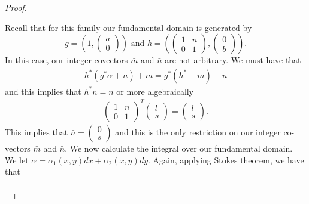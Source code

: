 \begin{proof}
    \begin{case}[$\mathcal{B}_{n,a,b}$]
        Recall that for this family our fundamental domain is generated by
        $$g=\left( 1, \begin{pmatrix}
                    a \\ 0
                \end{pmatrix} \right) \text{ and } h=\left( \begin{pmatrix}
                    1 & n \\
                    0 & 1
                \end{pmatrix}, \begin{pmatrix}
                    0 \\ b
                \end{pmatrix} \right).$$
        In this case, our integer covectors $\bar{m}$ and $\bar{n}$ are not arbitrary. We must have that
        \begin{align*}
            h^*(g^*\alpha + \bar{n}) + \bar{m} = g^*(h^*+\bar{m})+ \bar{n}
        \end{align*}
        and this implies that $h^*n = n$ or more algebraically
        \begin{align*}
            \begin{pmatrix}
                1 & n \\
                0 & 1
            \end{pmatrix}^T\begin{pmatrix}
                               l \\
                               s
                           \end{pmatrix} = \begin{pmatrix}
                                               l \\
                                               s
                                           \end{pmatrix}.
        \end{align*}
        This implies that $\bar{n} = \begin{pmatrix}
                0 \\ s
            \end{pmatrix}$ and this is the only restriction on our integer co-vectors $\bar{m}$ and $\bar{n}$. We now calculate the integral over
        our fundamental domain. We let $\alpha = \alpha_1(x,y) dx + \alpha_2(x,y)dy$. Again, applying Stokes theorem, we have that
        \begin{align*}

\end{align*}
\end{case}
\end{proof}
